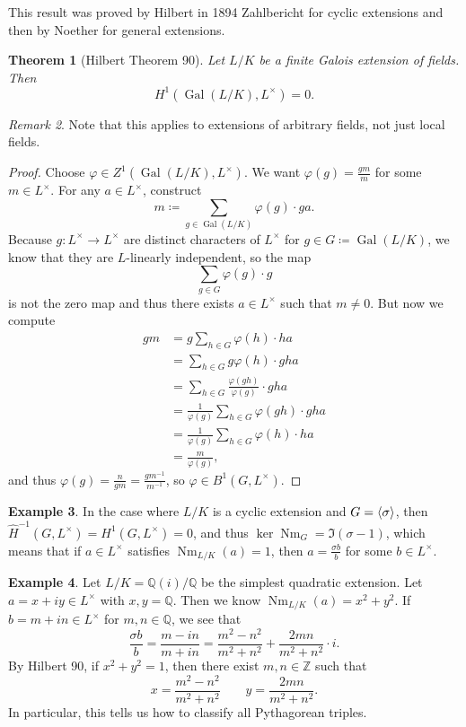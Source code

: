 \documentclass[leqno, openany]{memoir}
\newtheorem{thm}{Theorem}[section]
\theoremstyle{definition}
\newtheorem{exm}[thm]{Example}
\theoremstyle{remark}
\newtheorem{rmk}[thm]{Remark}
\theoremstyle{plain}
\theoremstyle{definition}
\theoremstyle{remark}
\newcommand{\Z}{\mathbb{Z}}
\newcommand{\Q}{\mathbb{Q}}
\newcommand{\wh}[1]{\widehat{#1}}
\DeclareMathOperator{\Gal}{Gal}
\DeclareMathOperator{\Nm}{Nm}
\begin{document}
This result was proved by Hilbert in 1894 Zahlbericht for cyclic extensions and then by Noether for general extensions.

\begin{thm}[Hilbert Theorem 90]
    Let $L/K$ be a finite Galois extension of fields. Then
    \[ H^1(\Gal(L/K), L^{\times}) = 0. \]
\end{thm}

\begin{rmk}
    Note that this applies to extensions of arbitrary fields, not just local fields.
\end{rmk}

\begin{proof}
    Choose $\varphi \in Z^1 (\Gal(L/K), L^{\times})$. We want $\varphi(g) = \frac{gm}{m}$ for some $m \in L^{\times}$. For any $a \in L^{\times}$, construct
    \[ m \coloneqq \sum_{g \in \Gal(L/K)} \varphi(g) \cdot ga. \]
    Because $g \colon L^{\times} \to L^{\times}$ are distinct characters of $L^{\times}$ for $g \in G \coloneqq \Gal(L/K)$, we know that they are $L$-linearly independent, so the map
    \[ \sum_{g \in G} \varphi(g) \cdot g \]
    is not the zero map and thus there exists $a \in L^{\times}$ such that $m \neq 0$. But now we compute
    \begin{align*} 
        gm &= g \sum_{h \in G} \varphi(h) \cdot ha \\
           &= \sum_{h \in G} g \varphi(h) \cdot gha \\
           &= \sum_{h \in G} \frac{\varphi(gh)}{\varphi(g)} \cdot gha \\ 
           &= \frac{1}{\varphi(g)} \sum_{h \in G} \varphi(gh) \cdot gha \\
           &= \frac{1}{\varphi(g)} \sum_{h \in G} \varphi(h) \cdot ha \\
           &= \frac{m}{\varphi(g)},
    \end{align*}
    and thus $\varphi(g) = \frac{n}{gm} = \frac{gm^{-1}}{m^{-1}}$, so $\varphi \in B^1(G, L^{\times})$.
\end{proof}

\begin{exm}
    In the case where $L/K$ is a cyclic extension and $G = \ev{\sigma}$, then $\wh{H}^{-1}(G, L^{\times}) = H^1(G, L^{\times}) = 0$, and thus $\ker \Nm_G = \Im (\sigma - 1)$, which means that if $a \in L^{\times}$ satisfies $\Nm_{L/K}(a) = 1$, then $a = \frac{\sigma b}{b}$ for some $b \in L^{\times}$.
\end{exm}

\begin{exm}
    Let $L/K = \Q(i)/\Q$ be the simplest quadratic extension. Let $a = x+iy \in L^{\times}$ with $x,y = \Q$. Then we know $\Nm_{L/K}(a) = x^2 + y^2$. If $b = m + in \in L^{\times}$ for $m,n \in \Q$, we see that
    \[ \frac{\sigma b}{b} = \frac{m-in}{m+in} = \frac{m^2-n^2}{m^2+n^2} + \frac{2mn}{m^2+n^2} \cdot i. \]
    By Hilbert 90, if $x^2 + y^2 = 1$, then there exist $m,n \in \Z$ such that 
    \[ x = \frac{m^2 - n^2}{m^2 + n^2} \qquad y = \frac{2mn}{m^2 + n^2}. \]
    In particular, this tells us how to classify all Pythagorean triples.
\end{exm}
\end{document}
